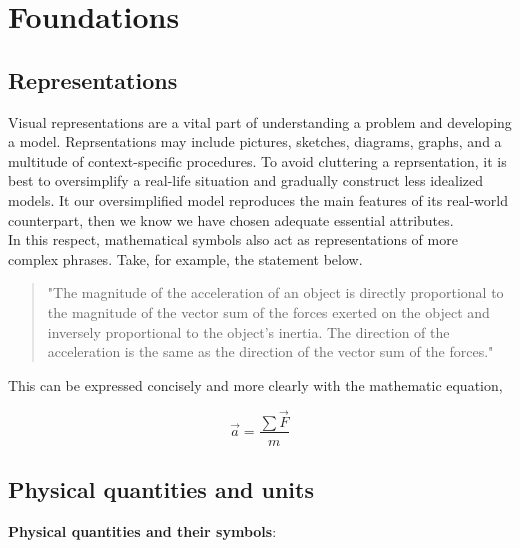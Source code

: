 \section{Foundations}

    \subsection{Representations}

        Visual representations are a vital part of understanding a problem and developing a model. Reprsentations may include pictures, sketches, diagrams, graphs, and a multitude of context-specific procedures.
        To avoid cluttering a reprsentation, it is best to oversimplify a real-life situation and gradually construct less idealized models. It our oversimplified model reproduces the main features of its real-world
        counterpart, then we know we have chosen adequate essential attributes. \\

        \noindent In this respect, mathematical symbols also act as representations of more complex phrases. Take, for example, the statement below.

        \begin{quote}
            "The magnitude of the acceleration of an object is directly proportional to the magnitude of the vector sum of the forces exerted on the object and inversely proportional to the object's inertia.
            The direction of the acceleration is the same as the direction of the vector sum of the forces."
        \end{quote}

        \noindent This can be expressed concisely and more clearly with the mathematic equation,

        \begin{equation*}
            \overrightarrow{a} = \frac{\sum \overrightarrow{F}}{m}
        \end{equation*}


    \subsection{Physical quantities and units}

        \textbf{Physical quantities and their symbols}:

